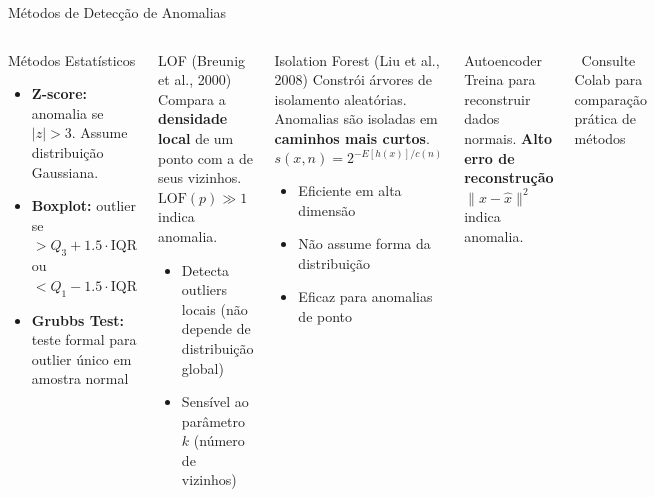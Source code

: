 \documentclass[aspectratio=169]{beamer}
\begin{document}
\begin{frame}[shrink=5]{Métodos de Detecção de Anomalias}
    \begin{columns}
        \begin{block}{Métodos Estatísticos}
            \begin{itemize}\footnotesize
                \item \textbf{Z-score:} anomalia se $|z| > 3$. Assume distribuição Gaussiana.
                \item \textbf{Boxplot:} outlier se $> Q_3 + 1{.}5 \cdot \text{IQR}$ ou $< Q_1 - 1{.}5 \cdot \text{IQR}$
                \item \textbf{Grubbs Test:} teste formal para outlier único em amostra normal
            \end{itemize}
        \end{block}
        \begin{block}{LOF (Breunig et al., 2000)}
            \footnotesize
            Compara a \textbf{densidade local} de um ponto com a de seus vizinhos. $\text{LOF}(p) \gg 1$ indica anomalia.
            \begin{itemize}\footnotesize
                \item Detecta outliers locais (não depende de distribuição global)
                \item Sensível ao parâmetro $k$ (número de vizinhos)
            \end{itemize}
        \end{block}
        \begin{block}{Isolation Forest (Liu et al., 2008)}
            \footnotesize
            Constrói árvores de isolamento aleatórias. Anomalias são isoladas em \textbf{caminhos mais curtos}.
            \[
              s(x,n) = 2^{-E[h(x)]/c(n)}
            \]
            \begin{itemize}\footnotesize
                \item Eficiente em alta dimensão
                \item Não assume forma da distribuição
                \item Eficaz para anomalias de ponto
            \end{itemize}
        \end{block}
        \begin{block}{Autoencoder}
            \footnotesize
            Treina para reconstruir dados normais. \textbf{Alto erro de reconstrução} $\|x-\hat{x}\|^2$ indica anomalia.
        \end{block}
        \centering\tiny \faArrowRight\ Consulte Colab para comparação prática de métodos
    \end{columns}
\end{frame}
\end{document}

